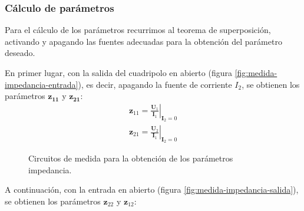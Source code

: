 \subsubsection{Cálculo de parámetros}

Para el cálculo de los parámetros recurrimos al teorema de superposición, activando y apagando las fuentes adecuadas para la obtención del parámetro deseado.

En primer lugar, con la salida del cuadripolo en abierto (figura \ref{fig:medida-impedancia-entrada}), es decir, apagando la fuente de corriente $I_2$, se obtienen los parámetros $\mathbf{z_{11}}$ y $\mathbf{z_{21}}$:
\[
  \begin{array}{c}
    \mathbf{z}_{11} = \left.\frac{\mathbf{U}_1}{\mathbf{I}_1}\right\rvert_{\mathbf{I}_2 = 0} \\
    \mathbf{z}_{21} = \left.\frac{\mathbf{U}_2}{\mathbf{I}_1}\right\rvert_{\mathbf{I}_2 = 0}
  \end{array}
\]

\begin{figure}[H]
  \centering
  \hspace{2cm}
\caption{Circuitos de medida para la obtención de los parámetros impedancia.}
  \label{fig:medida-impedancia}
\end{figure}


A continuación, con la entrada en abierto (figura \ref{fig:medida-impedancia-salida}), se obtienen los parámetros $\mathbf{z}_{22}$ y $\mathbf{z}_{12}$:

